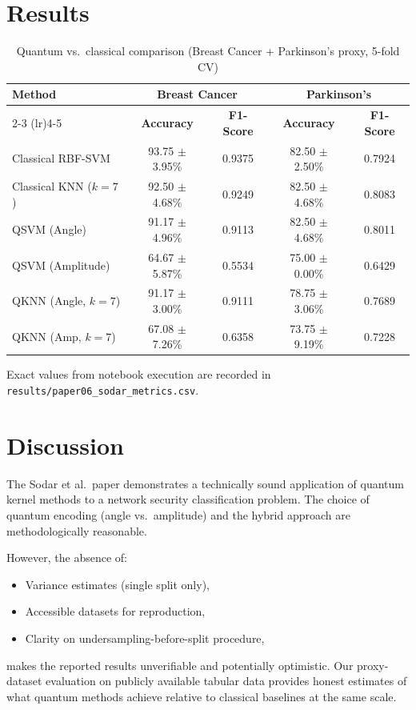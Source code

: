 \documentclass[12pt,a4paper]{article}
\begin{document}
\section{Results}
\begin{table}[h!]
  \centering
  \caption{Quantum vs.\ classical comparison (Breast Cancer + Parkinson's proxy, 5-fold CV)}
  \begin{tabular}{lcccc}
    \toprule
    \textbf{Method} & \multicolumn{2}{c}{\textbf{Breast Cancer}} & \multicolumn{2}{c}{\textbf{Parkinson's}}\\
    \cmidrule(lr){2-3} \cmidrule(lr){4-5}
    & \textbf{Accuracy} & \textbf{F1-Score} & \textbf{Accuracy} & \textbf{F1-Score}\\
    \midrule
    Classical RBF-SVM     & 93.75 $\pm$ 3.95\% & 0.9375 & 82.50 $\pm$ 2.50\% & 0.7924\\
    Classical KNN ($k=7$) & 92.50 $\pm$ 4.68\% & 0.9249 & 82.50 $\pm$ 4.68\% & 0.8083\\
    QSVM (Angle)          & 91.17 $\pm$ 4.96\% & 0.9113 & 82.50 $\pm$ 4.68\% & 0.8011\\
    QSVM (Amplitude)      & 64.67 $\pm$ 5.87\% & 0.5534 & 75.00 $\pm$ 0.00\% & 0.6429\\
    QKNN (Angle, $k=7$)   & 91.17 $\pm$ 3.00\% & 0.9111 & 78.75 $\pm$ 3.06\% & 0.7689\\
    QKNN (Amp, $k=7$)     & 67.08 $\pm$ 7.26\% & 0.6358 & 73.75 $\pm$ 9.19\% & 0.7228\\
    \bottomrule
  \end{tabular}
\end{table}

\noindent Exact values from notebook execution are recorded in \texttt{results/paper06\_sodar\_metrics.csv}.

\section{Discussion}
The Sodar et al.\ paper demonstrates a technically sound application of quantum kernel methods to a network security classification problem. The choice of quantum encoding (angle vs.\ amplitude) and the hybrid approach are methodologically reasonable.

However, the absence of:
\begin{itemize}[leftmargin=*]
  \item Variance estimates (single split only),
  \item Accessible datasets for reproduction,
  \item Clarity on undersampling-before-split procedure,
\end{itemize}
makes the reported results unverifiable and potentially optimistic. Our proxy-dataset evaluation on publicly available tabular data provides honest estimates of what quantum methods achieve relative to classical baselines at the same scale.
\end{document}
